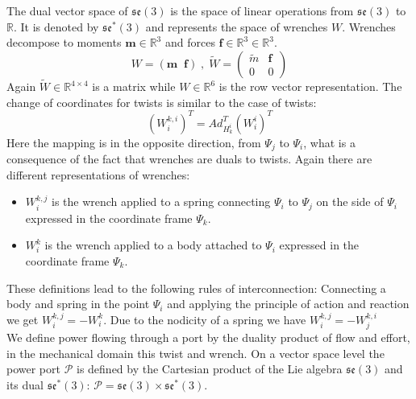 \documentclass[a4paper,twoside, openright,12pt]{report}
\newcommand{\f}[1]{\boldsymbol{#1}}
\begin{document}
The  dual vector space of $\mathfrak{se}(3)$ is the space of linear operations from $\mathfrak{se}(3)$ to $\mathbb{R} $. It is denoted by $\mathfrak{se}^*(3)$ and represents the space of wrenches $W$. Wrenches decompose to moments $ \f{m} \in \mathbb{R}^3 $ and forces $ \textbf{f} \in \mathbb{R}^3 \in \mathbb{R}^3$.
\begin{equation}
 W = ( \f{m} \;\; \textbf{f}) \; , \; \tilde{W} = \begin{pmatrix}
\tilde{m} & \textbf{f} \\ 0 & 0\end{pmatrix} \end{equation}
Again $\tilde{W} \in \mathbb{R}^{4\times 4}$ is a matrix while $W \in \mathbb{R}^6$ is the  row vector representation.
The change of coordinates for twists is similar to the case of twists:
\begin{equation}
(W_i^{k,i})^T = Ad_{H_k^i}^T (W_i^i)^T \end{equation} 
Here the mapping is in the opposite direction, from $\Psi_j$ to $\Psi_i$, what is a consequence of the fact that wrenches are duals to twists. Again there are different representations of wrenches: \begin{itemize}
\item $W_i^{k,j}$ is the wrench applied to a spring connecting $\Psi_i$ to $\Psi_j$ on the side of $\Psi_i$ expressed in the coordinate frame $\Psi_k$.
\item $W_i^k $ is the wrench applied to a body attached to $\Psi_i$ expressed in the coordinate frame $\Psi_k$.
\end{itemize}
These definitions lead to the following rules of interconnection:
Connecting a body and spring in the point $\Psi_i$ and applying the principle of action and reaction we get $W_i^{k,j} = -W_i^k$. Due to the nodicity of a spring we have $ W_i^{k,j} = -W_j^{k,i} $\\

We define power flowing through a port by the duality product of flow and effort, in the mechanical domain this twist and wrench. On a vector space level the power port $\mathcal{P}$ is defined by the Cartesian product of the Lie algebra $\mathfrak{se}(3)$ and its dual $\mathfrak{se}^*(3)$: $\mathcal{P} = \mathfrak{se}(3) \times \mathfrak{se}^*(3)$.
\end{document}
